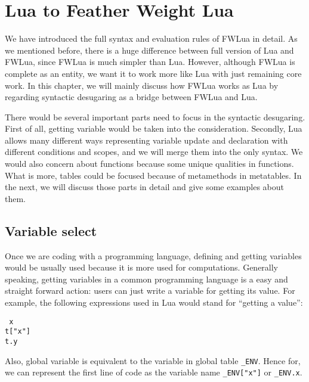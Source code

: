 \newcommand{\desugar}[2]{{#1} & \xlongequal[]{def} & {\begin{array}{@{}l@{}} #2 \end{array}}\\}
\chapter{Lua to Feather Weight Lua}

We have introduced the full syntax and evaluation rules of FWLua in detail. As we mentioned before, there is a huge difference between full version of Lua and FWLua, since FWLua is much simpler than Lua. However, although FWLua is complete as an entity, we want it to work more like Lua with just remaining core work. In this chapter, we will mainly discuss how FWLua works as Lua by regarding syntactic desugaring as a bridge between FWLua and Lua. 

There would be several important parts need to focus in the syntactic desugaring. First of all, getting variable would be taken into the consideration. Secondly, Lua allows many different ways representing variable update and declaration with different conditions and scopes, and we will merge them into the only syntax. We would also concern about functions because some unique qualities in functions. What is more, tables could be focused because of metamethods in metatables. In the next, we will discuss those parts in detail and give some examples about them.

\section{Variable select}
Once we are coding with a programming language, defining and getting variables would be usually used because it is more used for computations. Generally speaking, getting variables in a common programming language is a easy and straight forward action: users can just write a variable for getting its value. For example, the following expressions used in Lua would stand for ``getting a value'':
\begin{flushleft}
{\tt
x\\
t["x"]\\
t.y\\
}
\end{flushleft}
Also, global variable is equivalent to the variable in global table {\tt \_ENV}. Hence for, we can represent the first line of code as the variable name {\tt \_ENV["x"]} or {\tt \_ENV.x}.

